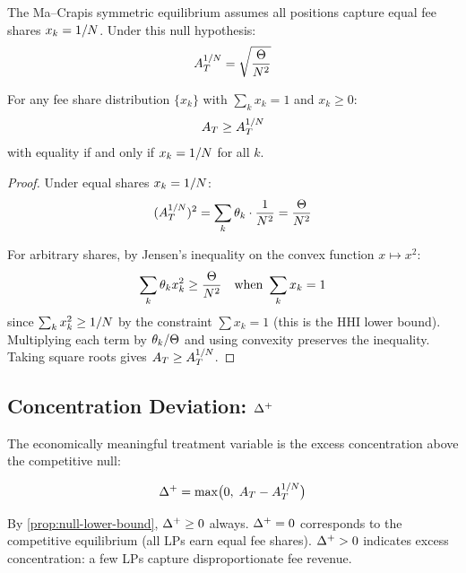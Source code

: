 The Ma--Crapis \cite{macrapis2024permissionless} symmetric equilibrium assumes all positions capture equal fee shares
$x_k = 1/N$. Under this null hypothesis:
\begin{equation}\label{eq:null-at}
  A_T^{1/N} = \sqrt{\frac{\Theta}{N^2}}
\end{equation}

\begin{proposition}\label{prop:null-lower-bound}
For any fee share distribution $\{x_k\}$ with $\sum_k x_k = 1$ and $x_k \geq 0$:
\begin{equation}
  A_T \geq A_T^{1/N}
\end{equation}
with equality if and only if $x_k = 1/N$ for all $k$.
\end{proposition}

\begin{proof}

 Under equal shares $x_k = 1/N$:
\[
  (A_T^{1/N})^2 = \sum_k \theta_k \cdot \frac{1}{N^2}
             = \frac{\Theta}{N^2}
\]

For arbitrary shares, by Jensen's inequality on the convex function $x \mapsto x^2$:
\[
  \sum_k \theta_k x_k^2 \geq \frac{\Theta}{N^2}
  \quad \text{when } \sum_k x_k = 1
\]
since $\sum_k x_k^2 \geq 1/N$ by the constraint $\sum x_k = 1$
(this is the HHI lower bound). Multiplying each term by $\theta_k/\Theta$
and using convexity preserves the inequality. Taking square roots gives $A_T \geq A_T^{1/N}$. \qedhere
\end{proof}

\subsection{Concentration Deviation: $\Delta^{+}$}\label{subsec:deviation}

The economically meaningful treatment variable is the excess concentration above the
competitive null:

\begin{definition}\label{def:delta-plus}
\begin{equation}\label{eq:delta-plus}
  \Delta^{+} = \max\bigl(0,\; A_T - A_T^{1/N}\bigr)
\end{equation}
\end{definition}

By \cref{prop:null-lower-bound}, $\Delta^{+} \geq 0$ always.
$\Delta^{+} = 0$ corresponds to the competitive equilibrium (all LPs earn equal fee shares).
$\Delta^{+} > 0$ indicates excess concentration: a few LPs capture disproportionate fee revenue.


